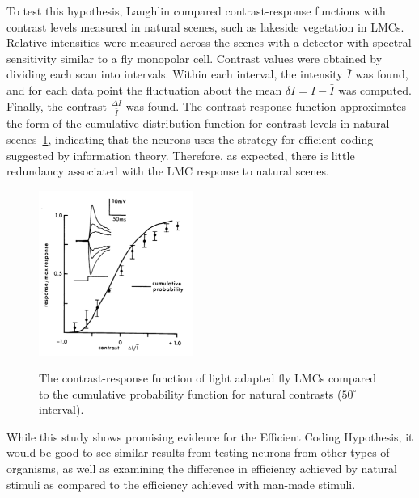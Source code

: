 \documentclass[twoside]{article}
\begin{document}
\begin{multicols}{2}
To test this hypothesis, Laughlin compared contrast-response functions with contrast levels measured in natural scenes, such as lakeside vegetation in LMCs. Relative intensities were measured across the scenes with a detector with spectral sensitivity similar to a fly monopolar cell. Contrast values were obtained by dividing each scan into intervals. Within each interval, the intensity $\bar{I}$ was found, and for each data point the fluctuation about the mean $\delta I = I - \bar{I}$ was computed. Finally, the contrast $\displaystyle\frac{\Delta I}{\bar{I}}$ was found. The contrast-response function approximates the form of the cumulative distribution function for contrast levels in natural scenes~\ref{fig:laughlin1981-fig2}, indicating that the neurons uses the strategy for efficient coding suggested by information theory. Therefore, as expected, there is little redundancy associated with the LMC response to natural scenes. 

\begin{figure}[H]
	\caption{
		The contrast-response function of light adapted fly LMCs compared to the cumulative probability function for natural contrasts ($50^\circ$ interval).
	}
	\includegraphics[width=0.45\textwidth]{laughlin1981-fig2}
	\label{fig:laughlin1981-fig2}
\end{figure}

While this study shows promising evidence for the Efficient Coding Hypothesis, it would be good to see similar results from testing neurons from other types of organisms, as well as examining the difference in efficiency achieved by natural stimuli as compared to the efficiency achieved with man-made stimuli.





\end{multicols}
\end{document}

